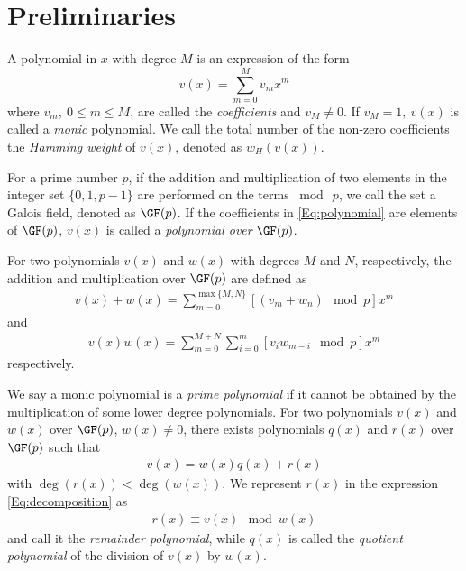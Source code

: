 \section{Preliminaries}
\label{secPrelim}

A polynomial in $x$ with degree $M$ is an expression of the form
\begin{equation}
v(x) = \sum_{m=0}^{M} v_mx^m
\label{Eq:polynomial}
\end{equation}
where $v_m,~0 \leq m \leq M$, are called the \textit{coefficients} and $v_M \neq 0$. If $v_M=1,~v(x)$ is called a \textit{monic} polynomial. We call the total number of the non-zero coefficients the \textit{Hamming weight} of $v(x)$, denoted as $w_H(v(x))$.

For a prime number $p$, if the addition and multiplication of two elements in the integer set $\{ 0,1,p-1\}$ are performed on the terms $\bmod~p$, we call the set a Galois field, denoted as $\GF(p)$. If the coefficients in \eqref{Eq:polynomial} are elements of $\GF(p)$, $v(x)$ is called a {\it polynomial over} $\GF(p)$.


For two polynomials $v(x)$ and $w(x)$ with degrees $M$ and $N$, respectively, the addition and multiplication over $\GF(p)$ are defined as 
\begin{align}
v(x)+w(x)=\sum_{m=0}^{\max\{ M,N\}} [(v_m +w_n)\mod p] x^m
\label{Eq:addition}
\end{align}
and
\begin{align}
v(x)w(x)=\sum_{m=0}^{ M+N} \sum_{i=0}^{m} [v_i w_{m-i}\mod p]x^m
\label{Eq:multiplication}
\end{align}
respectively. 

We say a monic polynomial is a \textit{prime polynomial} if it cannot be obtained by the multiplication of some lower degree polynomials.
For two polynomials $v(x)$ and $w(x)$ over $\GF(p)$, $w(x) \neq 0$, there exists polynomials $q(x)$ and $r(x)$ 
over $\GF(p)$ such that 
\begin{align}
v(x) = w(x)q(x)+r(x)
\label{Eq:decomposition}
\end{align}
with $\deg(r(x)) < \deg(w(x))$. We represent $r(x)$ in the expression \eqref{Eq:decomposition} as
\begin{align}
r(x) \equiv v(x)\mod w(x)
\end{align}
and call it the \textit{remainder polynomial}, while $q(x)$ is called the \textit{quotient polynomial} of the division of $v(x)$ by $w(x)$.

